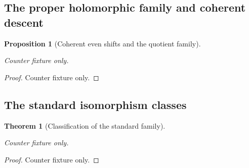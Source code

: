 \documentclass{article}
\newtheorem{theorem}{Theorem}[section]
\newtheorem{proposition}[proposition]{Proposition}
\begin{document}
\setcounter{section}{7}
\setcounter{subsection}{1}
\setcounter{theorem}{4}
\subsection{The proper holomorphic family and coherent descent}\hypertarget{tag-01PC}{}\label{fam:section:A.3}

\begin{proposition}[Coherent even shifts and the quotient family]\hypertarget{tag-01Q2}{}\label{fam:src:A.3.1}\label{fam:st:A.3.1}\label{I:coherent-descent-proof}
Counter fixture only.
\end{proposition}
\begin{proof}Counter fixture only.\end{proof}
\setcounter{subsection}{3}
\setcounter{theorem}{7}
\subsection{The standard isomorphism classes}\hypertarget{tag-01PE}{}\label{fam:section:A.5}
\begin{theorem}[Classification of the standard family]\hypertarget{tag-01Q6}{}\label{fam:src:A.5.1}\label{fam:st:A.5.1}\label{wb:pshift:thm:classification}\hypertarget{tag-000C}{}\label{app:rederive:fam-src-A.5.1}
Counter fixture only.
\end{theorem}
\begin{proof}Counter fixture only.\end{proof}
\end{document}
